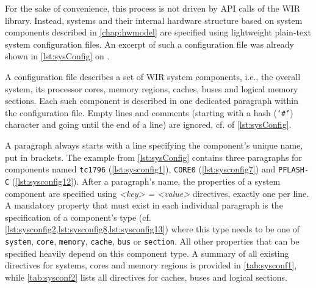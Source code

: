 For the sake of convenience, this process is not driven by \gls{API} calls of the \gls{WIR} library.
Instead, systems and their internal hardware structure based on system components described in \cref{chap:hwmodel} are specified using lightweight plain-text system configuration files.
An excerpt of such a configuration file was already shown in \cref{lst:sysConfig} on .

A configuration file describes a set of \gls{WIR} system components, i.e., the overall system, its processor cores, memory regions, caches, buses and logical memory sections.
Each such component is described in one dedicated paragraph within the configuration file.
Empty lines and comments (starting with a hash (\texttt{`\#'}) character and going until the end of a line) are ignored, cf.  of \cref{lst:sysConfig}.

A paragraph always starts with a line specifying the component's unique name, put in brackets.
The example from \cref{lst:sysConfig} contains three paragraphs for components named \texttt{tc1796} (\cref{lst:sysconfig1}), \texttt{CORE0} (\cref{lst:sysconfig7}) and \texttt{PFLASH-C} (\cref{lst:sysconfig12}).
After a paragraph's name, the properties of a system component are specified using \textit{<key> = <value>} directives, exactly one per line.
A mandatory property that must exist in each individual paragraph is the specification of a component's type (cf. \cref{lst:sysconfig2,lst:sysconfig8,lst:sysconfig13}) where this type needs to be one of \texttt{system}, \texttt{core}, \texttt{memory}, \texttt{cache}, \texttt{bus} or \texttt{section}.
All other properties that can be specified heavily depend on this component type.
A summary of all existing directives for systems, cores and memory regions is provided in \cref{tab:sysconf1}, while \cref{tab:sysconf2} lists all directives for caches, buses and logical sections.

\newpage

